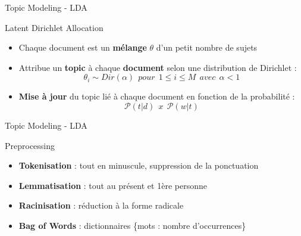 \documentclass[10pt,sans,usenames,dvipsnames,english,compress]{beamer}
\begin{document}
\begin{frame}{Topic Modeling - LDA}
	\begin{exampleblock}{Latent Dirichlet Allocation}
		\begin{itemize}
            \item Chaque document est un \textbf{mélange} $\theta$ d’un petit nombre de sujets
            \item Attribue un \textbf{topic} à chaque \textbf{document} selon une distribution de Dirichlet : $$\theta_{i} \sim Dir(\alpha) \: \: pour \: \: 1 \leq i \leq M \: \: avec \: \: \alpha < 1$$
            \item \textbf{Mise à jour} du topic lié à chaque document en fonction de la probabilité : $$\mathcal{P}(t | d) \: \: x \: \: \mathcal{P}(w | t)$$
          \end{itemize}
	\end{exampleblock}

\end{frame}

\begin{frame}{Topic Modeling - LDA}
	\begin{exampleblock}{Preprocessing}
            \begin{itemize}
            \item \textbf{Tokenisation} : tout en minuscule, suppression de la ponctuation
            \item \textbf{Lemmatisation} : tout au présent et 1ère personne
            \item \textbf{Racinisation} : réduction à la forme radicale
            \item \textbf{Bag of Words} : dictionnaires \{mots : nombre d’occurrences\}
            \end{itemize}
	\end{exampleblock}

\end{frame}
\end{document}
